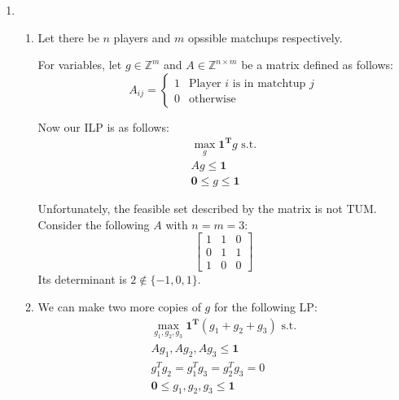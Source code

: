 \documentclass[12pt]{article}
\begin{document}
\begin{enumerate}
      \item \begin{enumerate}
                  \item Let there be $n$ players and $m$ opssible matchups respectively.

                        For variables, let $g \in \mathbb{Z}^m$ and $A \in \mathbb{Z}^{n \times m}$
                        be a matrix defined as follows:
                        \[A_{ij}=\begin{cases}
                                    1 & \text{Player $i$ is in matchtup $j$} \\
                                    0 & \text{otherwise}
                              \end{cases}\]

                        Now our ILP is as follows:
                        \begin{gather*}
                              \max_{g} \mathbf{1^T}g \text{ s.t.} \\
                              Ag \le \mathbf{1} \\
                              \mathbf{0} \le g \le \mathbf{1}
                        \end{gather*}

                        Unfortunately, the feasible set described by the matrix is not TUM.
                        Consider the following $A$ with $n=m=3$:
                        \[\begin{bmatrix}
                                    1 & 1 & 0 \\
                                    0 & 1 & 1 \\
                                    1 & 0 & 0
                              \end{bmatrix}\]
                        Its determinant is $2 \notin \{-1, 0, 1\}$.
                  \item We can make two more copies of $g$ for the following LP:
                        \begin{gather*}
                              \max_{g_1, g_2, g_3} \mathbf{1^T}(g_1+g_2+g_3) \text{ s.t.} \\
                              Ag_1, Ag_2, Ag_3 \le \mathbf{1} \\
                              g_1^Tg_2=g_1^Tg_3=g_2^Tg_3=0 \\
                              \mathbf{0} \le g_1, g_2, g_3 \le \mathbf{1}
                        \end{gather*}
            \end{enumerate}


\end{enumerate}
\end{document}
